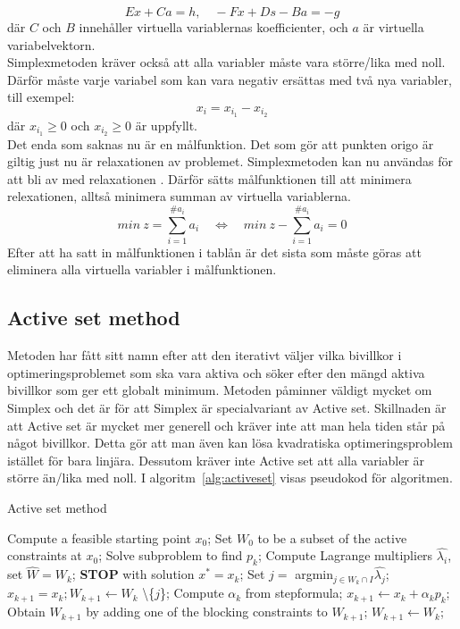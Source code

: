 $$Ex+Ca = h, \quad -Fx + Ds - Ba = -g$$
där $C$ och $B$ innehåller virtuella variablernas koefficienter, och $a$ är virtuella variabelvektorn. \\ 
Simplexmetoden kräver också att alla variabler måste vara större/lika med noll. Därför måste varje variabel som kan vara negativ ersättas med två nya variabler, till exempel: \citep{numericaloptimization}
$$x_i = x_{i_1} - x_{i_2}$$
där $x_{i_1}\geq 0$ och $x_{i_2}\geq 0$ är uppfyllt. \\
Det enda som saknas nu är en målfunktion. Det som gör att punkten origo är giltig just nu är relaxationen av problemet. Simplexmetoden kan nu användas för att bli av med relaxationen . Därför sätts målfunktionen till att minimera relexationen, alltså minimera summan av virtuella variablerna. \citep{numericaloptimization}
$$min \: z = \sum^{\#a_i}_{i=1} {a_i} \quad  \Leftrightarrow \quad min \: z - \sum^{\#a_i}_{i=1} {a_i} = 0$$
Efter att ha satt in målfunktionen i tablån är det sista som måste göras att eliminera alla virtuella variabler i målfunktionen. \citep{numericaloptimization}

\subsection{Active set method}   
Metoden har fått sitt namn efter att den iterativt väljer vilka bivillkor i optimeringsproblemet som ska vara aktiva och söker efter den mängd aktiva bivillkor som ger ett globalt minimum. Metoden påminner väldigt mycket om Simplex och det är för att Simplex är specialvariant av Active set. Skillnaden är att Active set är mycket mer generell och kräver inte att man hela tiden står på något bivillkor. Detta gör att man även kan lösa kvadratiska optimeringsproblem istället för bara linjära. Dessutom kräver inte Active set att alla variabler är större än/lika med noll. I algoritm~\ref{alg:activeset} visas pseudokod för algoritmen. 
\citep{numericaloptimization}

\begin{algorithm}[H]
\caption{Active set method}
\label{alg:activeset}
\begin{algorithmic}
\State Compute a feasible starting point $x_0$;
\State Set $W_0$ to be a subset of the active constraints at $x_0$;
	\State Solve subproblem to find $p_k$;
		\State Compute Lagrange multipliers $\hat{\lambda_i}$,
		\State set $\hat{W} = W_k$; 
			\State \textbf{STOP} with solution $x^* = x_k$;
		\Else
			\State Set $j =$ argmin$_{j \in W_k \cap I}\hat{\lambda_j}$;
			\State $x_{k+1} = x_k; W_{k+1} \gets W_k$ \textbackslash \{$j$\};		
		\EndIf
	\Else		
		\State Compute $\alpha_k$ from stepformula;
		\State $x_{k+1} \gets x_k + \alpha_k p_k$;
			\State Obtain $W_{k+1}$ by adding one of the blocking constraints to $W_{k+1}$;
		\Else
			\State $W_{k+1} \gets W_k$;	
		\EndIf 	
	\EndIf
\EndFor 
\EndProcedure
\end{algorithmic}
\end{algorithm}

